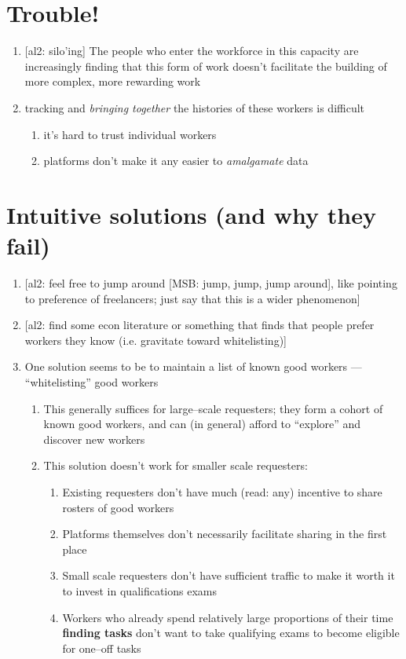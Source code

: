 \documentclass[10pt]{article}
\newcommand{\msb}[1]{{\color{PineGreen}[MSB: #1]}}
\newcommand{\ali}[1]{{\color{Red}[al2: #1]}}
\begin{document}
\section*{Trouble!}
\begin{enumerate}[noitemsep]
  \item \ali{silo'ing} The people who enter the workforce in this capacity are increasingly finding that
        this form of work doesn't facilitate the building of more complex, more rewarding work
  \item tracking and \textit{bringing together} the histories of these workers is difficult
  \begin{enumerate}[noitemsep]
    \item it's hard to trust individual workers
    \item platforms don't make it any easier to \textit{amalgamate} data
  \end{enumerate}
\end{enumerate}

\section*{Intuitive solutions (and why they fail)}
\begin{enumerate}[noitemsep]
  \item \ali{feel free to jump around \msb{jump, jump, jump around}, like pointing to preference of freelancers; just say that this is a wider phenomenon}
  \item \ali{find some econ literature or something that finds that people prefer workers they know (i.e. gravitate toward whitelisting)}
  \item One solution seems to be to maintain a list of known good workers --- ``whitelisting'' good workers
  \begin{enumerate}[noitemsep]
    \item This generally suffices for large--scale requesters; they form a cohort of known good workers, and
          can (in general) afford to ``explore'' and discover new workers
    \item This solution doesn't work for smaller scale requesters:
    \begin{enumerate}[noitemsep]
      \item Existing requesters don't have much (read: any) incentive to share rosters of good workers
      \item Platforms themselves don't necessarily facilitate sharing in the first place
      \item Small scale requesters don't have sufficient traffic to make it worth it to invest in qualifications exams
      \item Workers who already spend relatively large proportions of their time \textbf{finding tasks}
            don't want to take qualifying exams to become eligible for one--off tasks
    \end{enumerate}
  \end{enumerate}
\end{enumerate}
\end{document}
